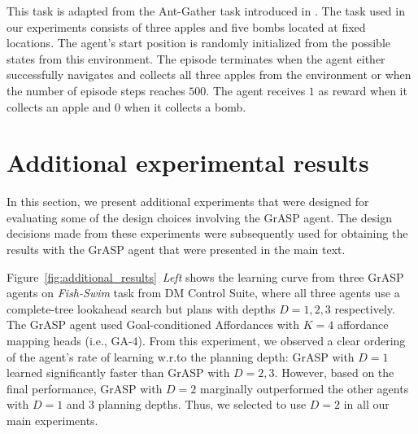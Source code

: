\documentclass[nohyperref]{article}
\theoremstyle{plain}
\theoremstyle{definition}
\theoremstyle{remark}
\newcommand{\grasp}{{G}r{ASP} }
\begin{document}
 This task is adapted from the Ant-Gather task introduced in \cite{florensa2017stochastic}. The task used in our experiments consists of three apples and five bombs located at fixed locations. The agent's start position is randomly initialized from the possible states from this environment. The episode terminates when the agent either successfully navigates and collects all three apples from the environment or when the number of episode steps reaches $500$. The agent receives $1$ as reward when it collects an apple and $0$ when it collects a bomb.

\section{Additional experimental results}
In this section, we present additional experiments that were designed for evaluating some of the design choices involving the \grasp agent. The design decisions made from these experiments were subsequently used for obtaining the results with the \grasp agent that were presented in the main text. 

 Figure~\ref{fig:additional_results}~\emph{Left} shows the learning curve from three \grasp agents on \emph{Fish-Swim} task from DM Control Suite, where all three agents use a complete-tree lookahead search but plans with depths $D=1, 2, 3$ respectively. The \grasp agent used Goal-conditioned Affordances with $K=4$ affordance mapping heads (i.e., GA-4). From this experiment, we observed a clear ordering of the agent's rate of learning w.r.to the planning depth: \grasp with $ D = 1 $ learned significantly faster than \grasp with $D=2, 3$. However, based on the final performance, \grasp with $D=2$ marginally outperformed the other agents with $D=1$ and $3$ planning depths. Thus, we selected to use $D=2$ in all our main experiments. 
\end{document}
